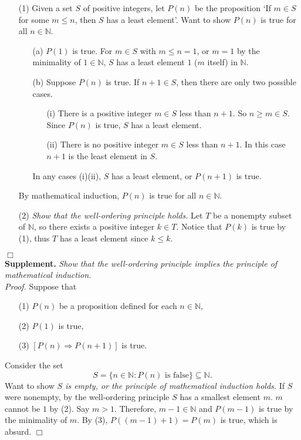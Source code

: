 \documentclass{article}
\begin{document}
\begin{enumerate}
\item[(1)]
Given a set $S$ of positive integers,
let $P(n)$ be the proposition
`If $m \in S$ for some $m \leq n$, then $S$ has a least element'.
Want to show $P(n)$ is true for all $n \in \mathbb{N}$.
\begin{enumerate}
\item[(a)]
$P(1)$ is true.
For $m \in S$ with $m \leq n = 1$,
or $m = 1$ by the minimality of $1 \in \mathbb{N}$,
$S$ has a least element $1$ ($m$ itself) in $\mathbb{N}$.
\item[(b)]
Suppose $P(n)$ is true.
If $n+1 \in S$, then there are only two possible cases.
  \begin{enumerate}
  \item[(i)]
  There is a positive integer $m \in S$ less than $n+1$.
  So $n \geq m \in S$.
  Since $P(n)$ is true, $S$ has a least element.
  \item[(ii)]
  There is no positive integer $m \in S$ less than $n+1$.
  In this case $n+1$ is the least element in $S$.
  \end{enumerate}
  In any cases (i)(ii), $S$ has a least element, or $P(n+1)$ is true.
\end{enumerate}
By mathematical induction, $P(n)$ is true for all $n \in \mathbb{N}$.
\item[(2)]
\emph{Show that the well-ordering principle holds.}
Let $T$ be a nonempty subset of $\mathbb{N}$,
so there exists a positive integer $k \in T$.
Notice that $P(k)$ is true by (1),
thus $T$ has a least element since $k \leq k$.
\end{enumerate}
$\Box$ \\

\textbf{Supplement.}
\emph{Show that the well-ordering principle implies
the principle of mathematical induction.} \\

\emph{Proof.}
Suppose that
\begin{enumerate}
\item[(1)]
$P(n)$ be a proposition defined for each $n \in \mathbb{N}$,
\item[(2)]
$P(1)$ is true,
\item[(3)]
$[P(n) \Rightarrow P(n+1)]$ is true.
\end{enumerate}

Consider the set
$$S = \{ n \in \mathbb{N} : P(n) \text{ is false} \} \subseteq \mathbb{N}.$$
Want to show
\emph{$S$ is empty, or the principle of mathematical induction holds.}
If $S$ were nonempty,
by the well-ordering principle $S$ has a smallest element $m$.
$m$ cannot be $1$ by (2).
Say $m > 1$.
Therefore, $m - 1 \in \mathbb{N}$
and $P(m-1)$ is true by the minimality of $m$.
By (3), $P((m-1)+1) = P(m)$ is true, which is absurd.
$\Box$ \\\\
\end{document}
